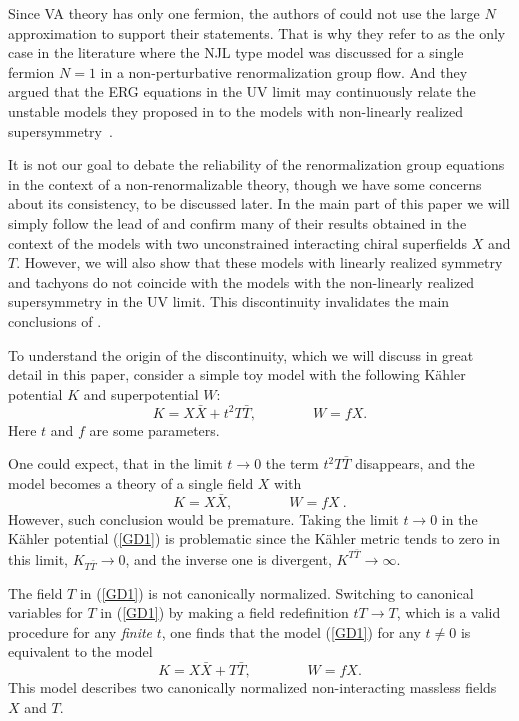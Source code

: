 \documentclass[11pt]{article}
\newcommand{\be}{\begin{equation}}
\newcommand{\ee}{\end{equation}}
\def\K{K{\"a}hler }
\newcommand{\rf}[1]{(\ref{#1})}
\def\be{\begin{equation}}
\def\ee{\end{equation}}
\begin{document}
Since VA theory has only one fermion, the authors of  \cite{DallAgata:2022abm}   could not use the large $N$ approximation to support their statements.  
That is why  they  refer to \cite{Jaeckel:2002rm} as the only case in the literature where  the NJL type model  was discussed for a single fermion $N=1$ in a non-perturbative renormalization group flow. 
 And they argued that the  ERG  equations in the UV limit may continuously relate the unstable models they proposed in  \cite{DallAgata:2022abm}  to the models with non-linearly realized supersymmetry~\cite{Volkov:1973ix,Bergshoeff:2015tra,Hasegawa:2015bza}.


It is not our goal to debate the reliability of the renormalization group equations in the context of a non-renormalizable theory, though we have some concerns about its consistency,  to be discussed later. In the main part of  this paper we will simply follow the lead of \cite{DallAgata:2022abm} and confirm many of their results obtained in the context of the models with two unconstrained interacting chiral superfields $X$ and $T$. However, we will also show that these models with linearly realized symmetry and tachyons do not coincide with the models with the non-linearly realized supersymmetry \cite{Volkov:1973ix,Bergshoeff:2015tra,Hasegawa:2015bza} in the UV limit. This discontinuity invalidates the main conclusions of \cite{DallAgata:2022abm}.

To understand the origin of the discontinuity, which we will discuss in great detail in this paper,  consider a simple toy model with the following \K potential $K$ and superpotential $W$:
\be
K=  X  {\bar X} +  t^{2} T  {\bar T},  \qquad \qquad W   =   f X.
\label{GD1} \ee
Here $t$ and $f$ are some  parameters.

One could expect,  that in the limit $t\to 0$ the term $ t^{2} T  {\bar T}$   disappears, and the model becomes a theory of a single field $X$ with
\be
K=  X  {\bar X} ,  \qquad \qquad W   =   f X \ . 
\label{GD2} \ee
However, such conclusion would be premature.  
Taking the limit $t\to 0$ in the \K potential \rf{GD1} %
is problematic 
since  the \K metric tends to zero  in this limit,  $K_{T\bar T} \to 0$,  and the inverse one is divergent, $K^{T\bar T} \to \infty$.

The field $T$ in \rf{GD1} is not canonically normalized. Switching to canonical variables for $T$ in \rf{GD1} by making a field redefinition $t T \to T$, which is a valid procedure for any {\it finite} $t$, one finds that the model \rf{GD1} for any  $t\not = 0$ is equivalent to the model  
\be
K=  X  {\bar X} +  T  {\bar T},  \qquad \qquad W   =  fX .
\label{GD3} \ee
This model describes two canonically normalized non-interacting massless fields $X$ and $T$.
\end{document}
